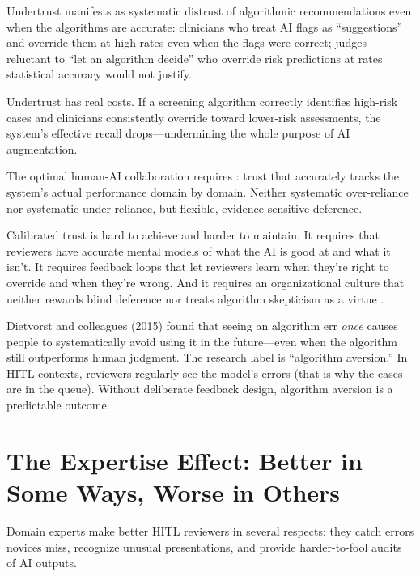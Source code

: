 Undertrust manifests as systematic distrust of algorithmic recommendations even when the algorithms are accurate: clinicians who treat AI flags as ``suggestions'' and override them at high rates even when the flags were correct; judges reluctant to ``let an algorithm decide'' who override risk predictions at rates statistical accuracy would not justify.

Undertrust has real costs. If a screening algorithm correctly identifies high-risk cases and clinicians consistently override toward lower-risk assessments, the system's effective recall drops---undermining the whole purpose of AI augmentation.

The optimal human-AI collaboration requires : trust that accurately tracks the system's actual performance domain by domain. Neither systematic over-reliance nor systematic under-reliance, but flexible, evidence-sensitive deference.

Calibrated trust is hard to achieve and harder to maintain. It requires that reviewers have accurate mental models of what the AI is good at and what it isn't. It requires feedback loops that let reviewers learn when they're right to override and when they're wrong. And it requires an organizational culture that neither rewards blind deference nor treats algorithm skepticism as a virtue \autocite{dietvorst2015algorithm}.

\begin{examplebox}
Dietvorst and colleagues (2015) found that seeing an algorithm err \emph{once} causes people to systematically avoid using it in the future---even when the algorithm still outperforms human judgment. The research label is ``algorithm aversion.'' In HITL contexts, reviewers regularly see the model's errors (that is why the cases are in the queue). Without deliberate feedback design, algorithm aversion is a predictable outcome.
\end{examplebox}

\section{The Expertise Effect: Better in Some Ways, Worse in Others}

Domain experts make better HITL reviewers in several respects: they catch errors novices miss, recognize unusual presentations, and provide harder-to-fool audits of AI outputs.

